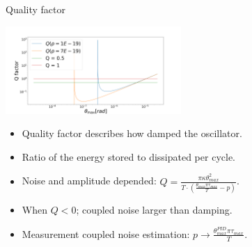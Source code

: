 \documentclass{beamer}
\begin{document}
\begin{frame}{Quality factor}
	\begin{center}		
		\includegraphics[width=0.5\textwidth,keepaspectratio]{Q factor.png}
	\end{center}
	\begin{itemize}	
		\item Quality factor describes how damped the oscillator.
		\item Ratio of the energy stored to dissipated per cycle.
		\item Noise and amplitude depended: $Q =  \frac{\pi\kappa\theta_{max}^2}{T\cdot(\frac{\theta_{max}\pi\tau_{max}}{T} -p)} $.
		\item When $Q<0$; coupled noise larger than damping.
		\item Measurement coupled noise estimation: $p \rightarrow \frac{ \theta_{max}^{PID}\pi\tau_{max}}{T}$. 				
	\end{itemize}
\end{frame}
\end{document}
